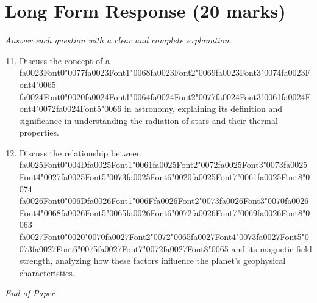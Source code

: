 \documentclass[12pt]{article}
\begin{document}
\section*{Long Form Response (20 marks)}
\textit{Answer each question with a clear and complete explanation.}
\begin{enumerate}[label=\arabic*.]
\setcounter{enumi}{10}
\item Discuss the concept of a {\csname fa0023Font0\endcsname\char"0077}{\csname fa0023Font1\endcsname\char"0068}{\csname fa0023Font2\endcsname\char"0069}{\csname fa0023Font3\endcsname\char"0074}{\csname fa0023Font4\endcsname\char"0065} {\csname fa0024Font0\endcsname\char"0020}{\csname fa0024Font1\endcsname\char"0064}{\csname fa0024Font2\endcsname\char"0077}{\csname fa0024Font3\endcsname\char"0061}{\csname fa0024Font4\endcsname\char"0072}{\csname fa0024Font5\endcsname\char"0066} in astronomy, explaining its definition and
significance in understanding the radiation of stars and their thermal properties.
\item Discuss the relationship between {\csname fa0025Font0\endcsname\char"004D}{\csname fa0025Font1\endcsname\char"0061}{\csname fa0025Font2\endcsname\char"0072}{\csname fa0025Font3\endcsname\char"0073}{\csname fa0025Font4\endcsname\char"0027}{\csname fa0025Font5\endcsname\char"0073}{\csname fa0025Font6\endcsname\char"0020}{\csname fa0025Font7\endcsname\char"0061}{\csname fa0025Font8\endcsname\char"0074} {\csname fa0026Font0\endcsname\char"006D}{\csname fa0026Font1\endcsname\char"006F}{\csname fa0026Font2\endcsname\char"0073}{\csname fa0026Font3\endcsname\char"0070}{\csname fa0026Font4\endcsname\char"0068}{\csname fa0026Font5\endcsname\char"0065}{\csname fa0026Font6\endcsname\char"0072}{\csname fa0026Font7\endcsname\char"0069}{\csname fa0026Font8\endcsname\char"0063} {\csname fa0027Font0\endcsname\char"0020}{\char"0070}{\csname fa0027Font2\endcsname\char"0072}{\char"0065}{\csname fa0027Font4\endcsname\char"0073}{\csname fa0027Font5\endcsname\char"0073}{\csname fa0027Font6\endcsname\char"0075}{\csname fa0027Font7\endcsname\char"0072}{\csname fa0027Font8\endcsname\char"0065} and its magnetic field strength,
analyzing how these factors influence the planet's geophysical characteristics.
\end{enumerate}

\vfill
\noindent\textit{End of Paper}
\end{document}
